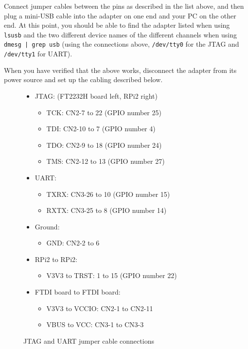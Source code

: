 \documentclass[a4paper,11pt,reqno]{amsart}
\begin{document}
Connect jumper cables between the pins as described in the list above, and then plug a mini-USB cable into the adapter on one end and your PC on the other end. At this point, you should be able to find the adapter listed when using \texttt{lsusb} and the two different device names of the different channels when using \texttt{dmesg | grep usb} (using the connections above, \texttt{/dev/tty0} for the JTAG and \texttt{/dev/tty1} for UART).

When you have verified that the above works, disconnect the adapter from its power source and set up the cabling described below.

\begin{figure}[hb]
\begin{center}
\begin{itemize}
	\item JTAG: (FT2232H board left, RPi2 right)
		\begin{itemize}
		\item TCK:   CN2-7   to 22 (GPIO number 25)
		\item TDI:   CN2-10  to 7 (GPIO number 4)
		\item TDO:   CN2-9   to 18 (GPIO number 24)
		\item TMS:   CN2-12  to 13 (GPIO number 27)
		\end{itemize}
	\item UART:
		\begin{itemize}
		\item TXRX:  CN3-26  to 10 (GPIO number 15)
		\item RXTX:  CN3-25  to 8 (GPIO number 14)
		\end{itemize}
	\item Ground:
		\begin{itemize}
		\item GND:   CN2-2   to 6
		\end{itemize}
	\item RPi2 to RPi2:
		\begin{itemize}
		\item V3V3 to TRST:  1    to 15 (GPIO number 22)
		\end{itemize}
	\item FTDI board to FTDI board:
		\begin{itemize}
		\item V3V3 to VCCIO: CN2-1   to CN2-11
		\item VBUS to VCC:   CN3-1   to CN3-3
		\end{itemize}
\end{itemize}
\end{center}
\caption{JTAG and UART jumper cable connections}
\label{fig:con2}
\end{figure}
\end{document}
